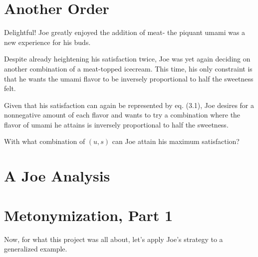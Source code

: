 \setcounter{chapter}{4}
\chapter{Another Order} %
Delightful! Joe greatly enjoyed the addition of meat- the piquant umami was a new experience for his buds.

Despite already heightening his satisfaction twice, Joe was yet again deciding on another combination of a meat-topped icecream.
This time, his only constraint is that he wants the umami flavor to be inversely proportional to half the sweetness felt.
\begin{eg} %
	Given that his satisfaction can again be represented by eq. (3.1), Joe desires for a nonnegative amount of each flavor and wants to try a combination where the flavor of umami he attains is inversely proportional to half the sweetness.

	With what combination of $(u, s)$ can Joe attain his maximum satisfaction?
\end{eg}
\setcounter{chapter}{5}
\chapter{A Joe Analysis}

\setcounter{chapter}{6}
\chapter{Metonymization, Part 1} %
Now, for what this project was all about, let's apply Joe's strategy to a generalized example.

